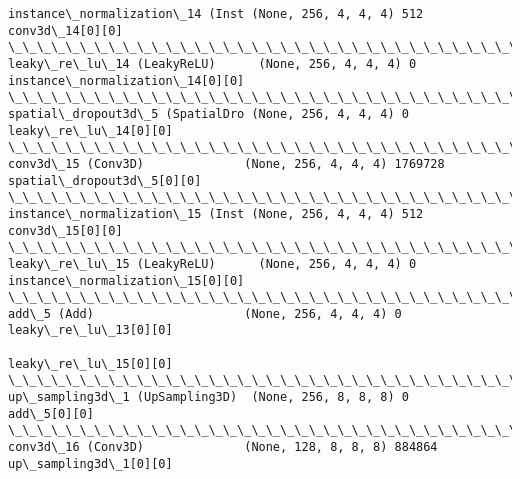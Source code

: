 \documentclass[11pt]{article}
\begin{document}
\begin{Verbatim}[commandchars=\\\{\}]
instance\_normalization\_14 (Inst (None, 256, 4, 4, 4) 512         conv3d\_14[0][0]                  
\_\_\_\_\_\_\_\_\_\_\_\_\_\_\_\_\_\_\_\_\_\_\_\_\_\_\_\_\_\_\_\_\_\_\_\_\_\_\_\_\_\_\_\_\_\_\_\_\_\_\_\_\_\_\_\_\_\_\_\_\_\_\_\_\_\_\_\_\_\_\_\_\_\_\_\_\_\_\_\_\_\_\_\_\_\_\_\_\_\_\_\_\_\_\_\_\_\_
leaky\_re\_lu\_14 (LeakyReLU)      (None, 256, 4, 4, 4) 0           instance\_normalization\_14[0][0]  
\_\_\_\_\_\_\_\_\_\_\_\_\_\_\_\_\_\_\_\_\_\_\_\_\_\_\_\_\_\_\_\_\_\_\_\_\_\_\_\_\_\_\_\_\_\_\_\_\_\_\_\_\_\_\_\_\_\_\_\_\_\_\_\_\_\_\_\_\_\_\_\_\_\_\_\_\_\_\_\_\_\_\_\_\_\_\_\_\_\_\_\_\_\_\_\_\_\_
spatial\_dropout3d\_5 (SpatialDro (None, 256, 4, 4, 4) 0           leaky\_re\_lu\_14[0][0]             
\_\_\_\_\_\_\_\_\_\_\_\_\_\_\_\_\_\_\_\_\_\_\_\_\_\_\_\_\_\_\_\_\_\_\_\_\_\_\_\_\_\_\_\_\_\_\_\_\_\_\_\_\_\_\_\_\_\_\_\_\_\_\_\_\_\_\_\_\_\_\_\_\_\_\_\_\_\_\_\_\_\_\_\_\_\_\_\_\_\_\_\_\_\_\_\_\_\_
conv3d\_15 (Conv3D)              (None, 256, 4, 4, 4) 1769728     spatial\_dropout3d\_5[0][0]        
\_\_\_\_\_\_\_\_\_\_\_\_\_\_\_\_\_\_\_\_\_\_\_\_\_\_\_\_\_\_\_\_\_\_\_\_\_\_\_\_\_\_\_\_\_\_\_\_\_\_\_\_\_\_\_\_\_\_\_\_\_\_\_\_\_\_\_\_\_\_\_\_\_\_\_\_\_\_\_\_\_\_\_\_\_\_\_\_\_\_\_\_\_\_\_\_\_\_
instance\_normalization\_15 (Inst (None, 256, 4, 4, 4) 512         conv3d\_15[0][0]                  
\_\_\_\_\_\_\_\_\_\_\_\_\_\_\_\_\_\_\_\_\_\_\_\_\_\_\_\_\_\_\_\_\_\_\_\_\_\_\_\_\_\_\_\_\_\_\_\_\_\_\_\_\_\_\_\_\_\_\_\_\_\_\_\_\_\_\_\_\_\_\_\_\_\_\_\_\_\_\_\_\_\_\_\_\_\_\_\_\_\_\_\_\_\_\_\_\_\_
leaky\_re\_lu\_15 (LeakyReLU)      (None, 256, 4, 4, 4) 0           instance\_normalization\_15[0][0]  
\_\_\_\_\_\_\_\_\_\_\_\_\_\_\_\_\_\_\_\_\_\_\_\_\_\_\_\_\_\_\_\_\_\_\_\_\_\_\_\_\_\_\_\_\_\_\_\_\_\_\_\_\_\_\_\_\_\_\_\_\_\_\_\_\_\_\_\_\_\_\_\_\_\_\_\_\_\_\_\_\_\_\_\_\_\_\_\_\_\_\_\_\_\_\_\_\_\_
add\_5 (Add)                     (None, 256, 4, 4, 4) 0           leaky\_re\_lu\_13[0][0]             
                                                                 leaky\_re\_lu\_15[0][0]             
\_\_\_\_\_\_\_\_\_\_\_\_\_\_\_\_\_\_\_\_\_\_\_\_\_\_\_\_\_\_\_\_\_\_\_\_\_\_\_\_\_\_\_\_\_\_\_\_\_\_\_\_\_\_\_\_\_\_\_\_\_\_\_\_\_\_\_\_\_\_\_\_\_\_\_\_\_\_\_\_\_\_\_\_\_\_\_\_\_\_\_\_\_\_\_\_\_\_
up\_sampling3d\_1 (UpSampling3D)  (None, 256, 8, 8, 8) 0           add\_5[0][0]                      
\_\_\_\_\_\_\_\_\_\_\_\_\_\_\_\_\_\_\_\_\_\_\_\_\_\_\_\_\_\_\_\_\_\_\_\_\_\_\_\_\_\_\_\_\_\_\_\_\_\_\_\_\_\_\_\_\_\_\_\_\_\_\_\_\_\_\_\_\_\_\_\_\_\_\_\_\_\_\_\_\_\_\_\_\_\_\_\_\_\_\_\_\_\_\_\_\_\_
conv3d\_16 (Conv3D)              (None, 128, 8, 8, 8) 884864      up\_sampling3d\_1[0][0]            

\end{Verbatim}
\end{document}
